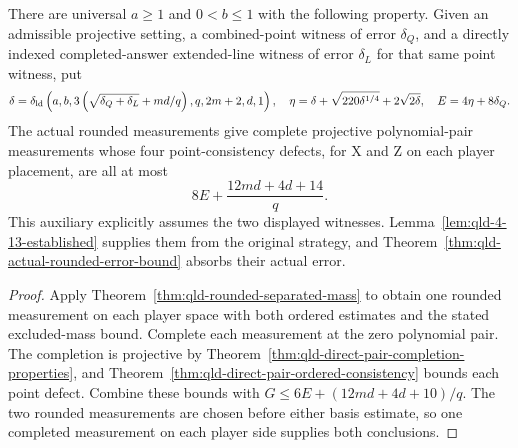 \begin{theorem}
\label{thm:qld-completed-pair-actual-error}
\leanok
{}
There are universal $a\geq1$ and $0<b\leq1$ with the following property.
Given an admissible projective setting, a combined-point witness of error
$\delta_Q$, and a directly indexed completed-answer extended-line witness
of error $\delta_L$ for that same point witness, put
\[
 \delta=\delta_{\rm ld}\left(a,b,
  3\left(\sqrt{\delta_Q+\delta_L}+md/q\right),q,2m+2,d,1\right),
 \quad \eta=\delta+\sqrt{220\delta^{1/4}}+2\sqrt{2\delta},
 \quad E=4\eta+8\delta_Q.
\]
The actual rounded measurements give complete projective polynomial-pair
measurements whose four point-consistency defects, for X and Z on each
player placement, are all at most
\[
 8E+\frac{12md+4d+14}{q}.
\]
This auxiliary explicitly assumes the two displayed witnesses.
Lemma~\ref{lem:qld-4-13-established} supplies them from the original strategy,
and Theorem~\ref{thm:qld-actual-rounded-error-bound} absorbs their actual error.
\end{theorem}
\begin{proof}
\leanok
{}
Apply Theorem~\ref{thm:qld-rounded-separated-mass} to obtain one rounded
measurement on each player space with both ordered estimates and the stated
excluded-mass bound. Complete each measurement at the zero polynomial pair.
The completion is projective by
Theorem~\ref{thm:qld-direct-pair-completion-properties}, and
Theorem~\ref{thm:qld-direct-pair-ordered-consistency} bounds each point defect.
Combine these bounds with $G\leq6E+(12md+4d+10)/q$.
The two rounded measurements are chosen before either basis estimate, so
one completed measurement on each player side supplies both conclusions.
\end{proof}

